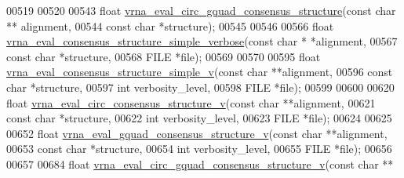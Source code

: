 \begin{DoxyCode}
00519 
00520 
00543 \textcolor{keywordtype}{float} \mbox{\hyperlink{group__eval_gac673ebb9ae2a29f54d201e2ac5b85540}{vrna\_eval\_circ\_gquad\_consensus\_structure}}(\textcolor{keyword}{const} \textcolor{keywordtype}{char} **
      alignment,
00544                                                \textcolor{keyword}{const} \textcolor{keywordtype}{char} *structure);
00545 
00546 
00566 \textcolor{keywordtype}{float} \mbox{\hyperlink{group__eval_ga1c07851f6b665c3461a19e9e4eb33d26}{vrna\_eval\_consensus\_structure\_simple\_verbose}}(\textcolor{keyword}{const} \textcolor{keywordtype}{char} *
      *alignment,
00567                                                    \textcolor{keyword}{const} \textcolor{keywordtype}{char} *structure,
00568                                                    FILE       *file);
00569 
00570 
00595 \textcolor{keywordtype}{float} \mbox{\hyperlink{group__eval_gad88927c62ab0a8b534e078e44be1b36e}{vrna\_eval\_consensus\_structure\_simple\_v}}(\textcolor{keyword}{const} \textcolor{keywordtype}{char} **alignment,
00596                                              \textcolor{keyword}{const} \textcolor{keywordtype}{char} *structure,
00597                                              \textcolor{keywordtype}{int}        verbosity\_level,
00598                                              FILE       *file);
00599 
00600 
00620 \textcolor{keywordtype}{float} \mbox{\hyperlink{group__eval_gae89240c230e4740b22a703ee953396b9}{vrna\_eval\_circ\_consensus\_structure\_v}}(\textcolor{keyword}{const} \textcolor{keywordtype}{char} **alignment,
00621                                            \textcolor{keyword}{const} \textcolor{keywordtype}{char} *structure,
00622                                            \textcolor{keywordtype}{int}        verbosity\_level,
00623                                            FILE       *file);
00624 
00625 
00652 \textcolor{keywordtype}{float} \mbox{\hyperlink{group__eval_ga8abc794fc48d43268ced5e8cde017baa}{vrna\_eval\_gquad\_consensus\_structure\_v}}(\textcolor{keyword}{const} \textcolor{keywordtype}{char}  **alignment,
00653                                             \textcolor{keyword}{const} \textcolor{keywordtype}{char}  *structure,
00654                                             \textcolor{keywordtype}{int}         verbosity\_level,
00655                                             FILE        *file);
00656 
00657 
00684 \textcolor{keywordtype}{float} \mbox{\hyperlink{group__eval_gaecd3e17292a0b3927277434019a5e187}{vrna\_eval\_circ\_gquad\_consensus\_structure\_v}}(\textcolor{keyword}{const} \textcolor{keywordtype}{char} **

\end{DoxyCode}
